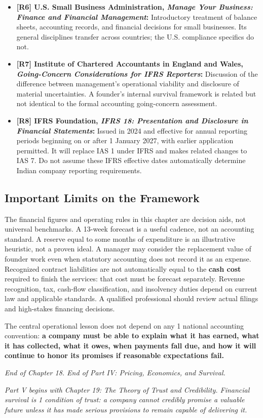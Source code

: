 \begin{itemize}
\item \textbf{[R6] U.S. Small Business Administration, \emph{Manage Your Business: Finance and Financial Management}:} Introductory treatment of balance sheets, accounting records, and financial decisions for small businesses. Its general disciplines transfer across countries; the U.S. compliance specifics do not.

\item \textbf{[R7] Institute of Chartered Accountants in England and Wales, \emph{Going-Concern Considerations for IFRS Reporters}:} Discussion of the difference between management's operational viability and disclosure of material uncertainties. A founder's internal survival framework is related but not identical to the formal accounting going-concern assessment.

\item \textbf{[R8] IFRS Foundation, \emph{IFRS 18: Presentation and Disclosure in Financial Statements}:} Issued in 2024 and effective for annual reporting periods beginning on or after 1 January 2027, with earlier application permitted. It will replace IAS 1 under IFRS and makes related changes to IAS 7. Do not assume these IFRS effective dates automatically determine Indian company reporting requirements.
\end{itemize}

\subsection*{Important Limits on the Framework}

The financial figures and operating rules in this chapter are decision aids, not universal benchmarks. A 13-week forecast is a useful cadence, not an accounting standard. A reserve equal to some months of expenditure is an illustrative heuristic, not a proven ideal. A manager may consider the replacement value of founder work even when statutory accounting does not record it as an expense. Recognized contract liabilities are not automatically equal to the \textbf{cash cost} required to finish the services: that cost must be forecast separately. Revenue recognition, tax, cash-flow classification, and insolvency duties depend on current law and applicable standards. A qualified professional should review actual filings and high-stakes financing decisions.

The central operational lesson does not depend on any 1 national accounting convention: \textbf{a company must be able to explain what it has earned, what it has collected, what it owes, when payments fall due, and how it will continue to honor its promises if reasonable expectations fail.}

\vspace{1.5em}
\noindent\emph{End of Chapter 18. End of Part IV: Pricing, Economics, and Survival.}

\vspace{0.8em}
\noindent\emph{Part V begins with Chapter 19: The Theory of Trust and Credibility. Financial survival is 1 condition of trust: a company cannot credibly promise a valuable future unless it has made serious provisions to remain capable of delivering it.}
